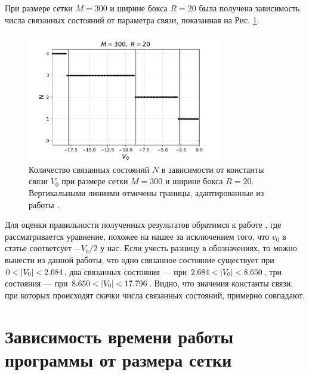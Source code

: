 \documentclass[10pt]{article}
\begin{document}
При размере сетки $M=300$ и ширине бокса $R=20$ была получена зависимость числа связанных состояний от параметра связи, показанная на Рис. \ref{fig:n_vs_v0}.
\begin{figure}[htbp]
    \centering
    \includegraphics[width=0.75\textwidth]{../figures/num_eigen_vs_v0}
    \caption{Количество связанных состояний $N$ в зависимости от константы связи $V_0$ при размере сетки $M=300$ и ширине бокса $R=20$. Вертикальными линиями отмечены границы, адаптированные из работы \cite{article}.}
    \label{fig:n_vs_v0}
\end{figure}
Для оценки правильности полученных результатов обратимся к работе \cite{article}, где рассматривается уравнение, похожее на нашее за исключением того, что $v_0$ в статье соответсует $-V_0/2$ у нас. Если учесть разницу в обозначениях, то можно вынести из данной работы, что одно связанное состояние существует при $0 < \abs{V_0} < 2.684$, два связанных состояния --- при $2.684 < \abs{V_0} < 8.650$, три состояния --- при $8.650 < \abs{V_0} < 17.796$. Видно, что значения константы связи, при которых происходят скачки числа связанных состояний, примерно совпадают.


\section{Зависимость времени работы программы от размера сетки}
\end{document}
